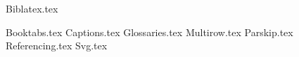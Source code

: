 {Biblatex.tex}
\usepackage[letterpaper, margin=2cm,includefoot,footskip=30pt]{geometry}
\usepackage[spanish, english]{babel}
\usepackage{amsmath}
\usepackage{amsthm}
\usepackage{amssymb}
\usepackage{csquotes}
\usepackage{expl3}
\usepackage{fontspec}
\usepackage{graphicx}
\usepackage{keyval}
\usepackage{tabulary}
\usepackage{url}
\usepackage{xparse}
\usepackage{blindtext}
\usepackage{datetime2}
\usepackage{float}
\usepackage{algorithm}
\usepackage{algpseudocode}
\usepackage{kbordermatrix}
{Booktabs.tex}
{Captions.tex}
{Glossaries.tex}
{Multirow.tex}
{Parskip.tex}
{Referencing.tex}
{Svg.tex}